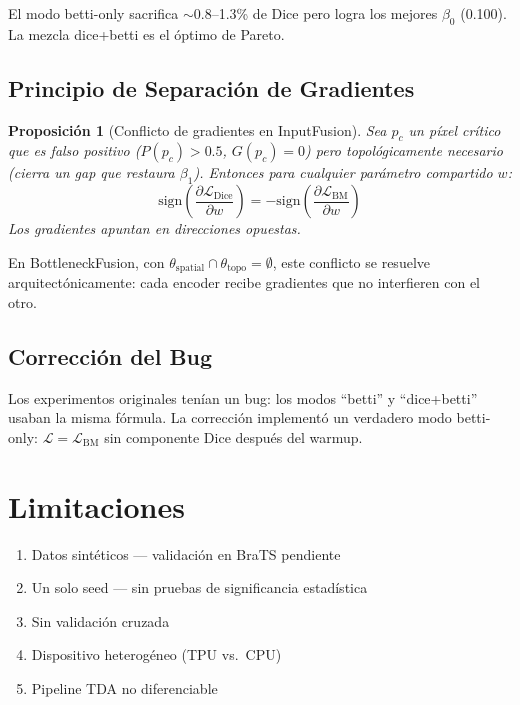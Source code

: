 \documentclass[10pt,twocolumn]{article}
\newtheorem{proposition}{Proposición}
\begin{document}
El modo betti-only sacrifica $\sim$0.8--1.3\% de Dice pero logra los mejores $\beta_0$ (0.100). La mezcla dice+betti es el óptimo de Pareto.

\subsection{Principio de Separación de Gradientes}

\begin{proposition}[Conflicto de gradientes en InputFusion]
Sea $p_c$ un píxel crítico que es falso positivo ($P(p_c) > 0.5$, $G(p_c) = 0$) pero topológicamente necesario (cierra un gap que restaura $\beta_1$). Entonces para cualquier parámetro compartido $w$:
\begin{equation}
\text{sign}\left(\frac{\partial \mathcal{L}_{\text{Dice}}}{\partial w}\right) = -\text{sign}\left(\frac{\partial \mathcal{L}_{\text{BM}}}{\partial w}\right)
\end{equation}
Los gradientes apuntan en direcciones opuestas.
\end{proposition}

En BottleneckFusion, con $\theta_{\text{spatial}} \cap \theta_{\text{topo}} = \emptyset$, este conflicto se resuelve arquitectónicamente: cada encoder recibe gradientes que no interfieren con el otro.

\subsection{Corrección del Bug}

Los experimentos originales tenían un bug: los modos ``betti'' y ``dice+betti'' usaban la misma fórmula. La corrección implementó un verdadero modo betti-only: $\mathcal{L} = \mathcal{L}_{\text{BM}}$ sin componente Dice después del warmup.

\section{Limitaciones}

\begin{enumerate}[noitemsep]
\item Datos sintéticos --- validación en BraTS pendiente
\item Un solo seed --- sin pruebas de significancia estadística
\item Sin validación cruzada
\item Dispositivo heterogéneo (TPU vs.\ CPU)
\item Pipeline TDA no diferenciable
\end{enumerate}
\end{document}
